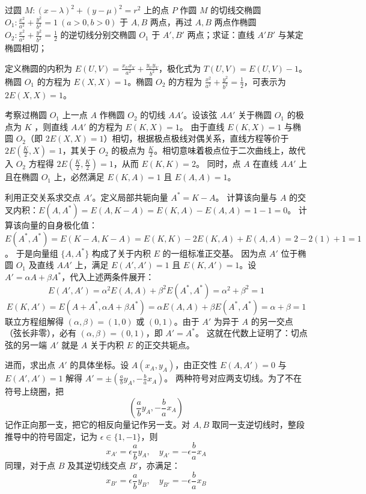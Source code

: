 \begin{exercise}
过圆 \(M: (x - \lambda)^2 + (y - \mu)^2 = r^2\) 上的点 \(P\) 作圆 \(M\) 的切线交椭圆 \(O_1: \frac{x^2}{a^2} + \frac{y^2}{b^2} = 1\ (a > 0, b > 0)\) 于 \(A,B\) 两点，再过 \(A,B\) 两点作椭圆 \(O_2: \frac{x^2}{a^2} + \frac{y^2}{b^2} = \frac{1}{2}\) 的逆切线分别交椭圆 \(O_1\) 于 \(A', B'\) 两点；求证：直线 \(A'B'\) 与某定椭圆相切；
\end{exercise}
\begin{solution}
定义椭圆的内积为 $E(U,V) = \frac{x_U x_V}{a^2} + \frac{y_U y_V}{b^2}$，极化式为 $T(U,V) = E(U,V) - 1$。
椭圆 $O_1$ 的方程为 $E(X,X) = 1$。椭圆 $O_2$ 的方程为 $\frac{x^2}{a^2} + \frac{y^2}{b^2} = \frac{1}{2}$，可表示为 $2E(X,X) = 1$。

考察过椭圆 $O_1$ 上一点 $A$ 作椭圆 $O_2$ 的切线 $AA'$。设该弦 $AA'$ 关于椭圆 $O_1$ 的极点为 $K$ ，则直线 $AA'$ 的方程为 $E(K,X) = 1$。
由于直线 $E(K,X) = 1$ 与椭圆 $O_2$（即 $2E(X,X) = 1$）相切，根据极点极线对偶关系，直线方程等价于 $2E(\frac{K}{2}, X) = 1$，其关于 $O_2$ 的极点为 $\frac{K}{2}$。相切意味着极点位于二次曲线上，故代入 $O_2$ 方程得 $2E(\frac{K}{2}, \frac{K}{2}) = 1$，从而 $E(K,K) = 2$。
同时，点 $A$ 在直线 $AA'$ 上且在椭圆 $O_1$ 上，必然满足 $E(K,A) = 1$ 且 $E(A,A) = 1$。

利用正交关系求交点 $A'$。定义局部共轭向量 $A^* = K - A$。
计算该向量与 $A$ 的交叉内积：$E(A, A^*) = E(A, K-A) = E(K,A) - E(A,A) = 1 - 1 = 0$。
计算该向量的自身极化值：$E(A^*, A^*) = E(K-A, K-A) = E(K,K) - 2E(K,A) + E(A,A) = 2 - 2(1) + 1 = 1$。
于是向量组 $\{A, A^*\}$ 构成了关于内积 $E$ 的一组标准正交基。
因为点 $A'$ 位于椭圆 $O_1$ 及直线 $AA'$ 上，满足 $E(A',A') = 1$ 且 $E(K,A') = 1$。设 $A' = \alpha A + \beta A^*$，代入上述两条件展开：
$$ E(A',A') = \alpha^2 E(A,A) + \beta^2 E(A^*,A^*) = \alpha^2 + \beta^2 = 1 $$
$$ E(K,A') = E(A+A^*, \alpha A + \beta A^*) = \alpha E(A,A) + \beta E(A^*,A^*) = \alpha + \beta = 1 $$
联立方程组解得 $(\alpha, \beta) = (1,0)$ 或 $(0,1)$。由于 $A'$ 为异于 $A$ 的另一交点（弦长非零），必有 $(\alpha, \beta) = (0,1)$，即 $A' = A^*$。
这就在代数上证明了：切点弦的另一端 $A'$ 就是 $A$ 关于内积 $E$ 的正交共轭点。

进而，求出点 $A'$ 的具体坐标。设 $A(x_A, y_A)$，由正交性 $E(A, A') = 0$ 与 $E(A', A') = 1$ 解得 $A' = \pm \left(\frac{a}{b}y_A, -\frac{b}{a}x_A\right)$。
两种符号对应两支切线。为了不在符号上绕圈，把
\[
\left(\frac{a}{b}y_A,-\frac{b}{a}x_A\right)
\]
记作正向那一支，把它的相反向量记作另一支。对 $A,B$ 取同一支逆切线时，整段推导中的符号固定，记为 $\epsilon \in \{1, -1\}$，则
$$ x_{A'} = \epsilon \frac{a}{b} y_A, \quad y_{A'} = -\epsilon \frac{b}{a} x_A $$
同理，对于点 $B$ 及其逆切线交点 $B'$，亦满足：
$$ x_{B'} = \epsilon \frac{a}{b} y_B, \quad y_{B'} = -\epsilon \frac{b}{a} x_B $$


\end{solution}
